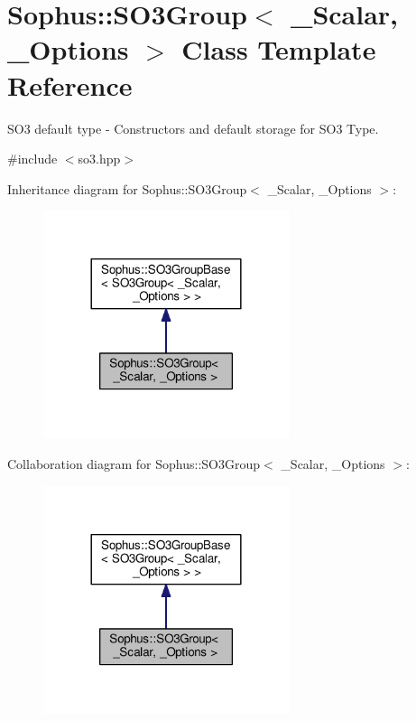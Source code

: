 \hypertarget{class_sophus_1_1_s_o3_group}{}\section{Sophus\+:\+:S\+O3\+Group$<$ \+\_\+\+Scalar, \+\_\+\+Options $>$ Class Template Reference}
\label{class_sophus_1_1_s_o3_group}


S\+O3 default type -\/ Constructors and default storage for S\+O3 Type.  




{\ttfamily \#include $<$so3.\+hpp$>$}



Inheritance diagram for Sophus\+:\+:S\+O3\+Group$<$ \+\_\+\+Scalar, \+\_\+\+Options $>$\+:
\nopagebreak
\begin{figure}[H]
\begin{center}
\leavevmode
\includegraphics[width=204pt]{class_sophus_1_1_s_o3_group__inherit__graph}
\end{center}
\end{figure}


Collaboration diagram for Sophus\+:\+:S\+O3\+Group$<$ \+\_\+\+Scalar, \+\_\+\+Options $>$\+:
\nopagebreak
\begin{figure}[H]
\begin{center}
\leavevmode
\includegraphics[width=204pt]{class_sophus_1_1_s_o3_group__coll__graph}
\end{center}
\end{figure}
